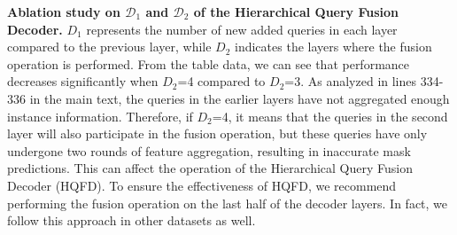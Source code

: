       
\textbf{Ablation study on $\mathcal{D}_1$ and $\mathcal{D}_2$ of the Hierarchical Query Fusion Decoder.} $D_1$ represents the number of new added queries in each layer compared to the previous layer, while $D_2$ indicates the layers where the fusion operation is performed. From the table data, we can see that performance decreases significantly when $D_2$=4 compared to $D_2$=3. As analyzed in lines 334-336 in the main text, the queries in the earlier layers have not aggregated enough instance information. Therefore, if $D_2$=4, it means that the queries in the second layer will also participate in the fusion operation, but these queries have only undergone two rounds of feature aggregation, resulting in inaccurate mask predictions. This can affect the operation of the Hierarchical Query Fusion Decoder (HQFD). To ensure the effectiveness of HQFD, we recommend performing the fusion operation on the last half of the decoder layers. In fact, we follow this approach in other datasets as well.

